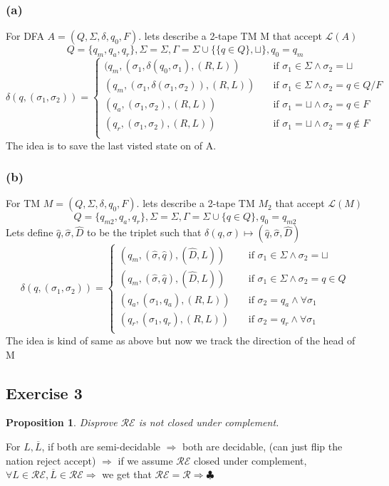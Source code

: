 \documentclass[12pt]{article}
\newtheorem{prop}{Proposition}
\begin{document}
\subsubsection*{(a)}For DFA  $A = (Q, \Sigma, \delta, q_0, F)$. lets describe a 2-tape TM M that accept $\mathcal{L}(A)$
\[
Q=\lbrace q_{m},q_a,q_r \rbrace,\Sigma =\Sigma ,\Gamma =\Sigma \cup\{\{q\in Q\} ,\sqcup \},q_0=q_{m}
\]
\[ \delta(q,(\sigma_1,\sigma_2))=
\begin{cases} 
      (q_m,(\sigma_1,\delta(q_0,\sigma_1),(R,L)) &\quad\text{if  } \sigma_1 \in \Sigma \wedge\sigma_2=\sqcup\\
       (q_m,(\sigma_1,\delta(\sigma_1,\sigma_2)),(R,L)) &\quad\text{if } \sigma_1 \in \Sigma \wedge\sigma_2=q\in Q/F \\
       (q_a,(\sigma_1,\sigma_2),(R,L)) &\quad\text{if } \sigma_1= \sqcup \wedge\sigma_2=q\in F \\
       (q_r,(\sigma_1,\sigma_2),(R,L)) &\quad\text{if } \sigma_1= \sqcup \wedge\sigma_2=q\notin F \\
     \end{cases}  
     \]   
The idea is to save the last visted state on of A.
\subsubsection*{(b)}
For TM  $M = (Q, \Sigma, \delta, q_0, F)$. lets describe a 2-tape TM $M_2$ that accept $\mathcal{L}(M)$
\[
Q=\lbrace q_{m2},q_a,q_r \rbrace,\Sigma =\Sigma ,\Gamma =\Sigma \cup\{q\in Q\} ,q_0=q_{m2}
\]
Lets define  $\hat{q},\hat{\sigma},\hat{D}$ to be the triplet such that $\delta(q,\sigma)\longmapsto (\hat{q},\hat{\sigma},\hat{D})$
\[ \delta(q,(\sigma_1,\sigma_2))=
\begin{cases} 
      (q_m,(\hat{\sigma},\hat{q}),(\hat{D},L)) &\quad\text{if  } \sigma_1 \in \Sigma \wedge\sigma_2=\sqcup\\
       (q_m,(\hat{\sigma},\hat{q}),(\hat{D},L)) &\quad\text{if } \sigma_1 \in \Sigma \wedge\sigma_2=q\in Q \\
       (q_a,(\sigma_1,q_a),(R,L)) &\quad\text{if }  \sigma_2=q_a \wedge \forall \sigma_1 \\
       (q_r,(\sigma_1,q_r),(R,L)) &\quad\text{if }\sigma_2=q_r \wedge \forall \sigma_1 \\ \end{cases}  
     \]  The idea is kind of same as above but now we track the direction of the head of M 
     \pagebreak
\subsection*{Exercise 3}
\begin{prop} Disprove $\mathcal{RE}$ is not closed under complement.\end{prop}
For $L,\overline{L}$, if both are semi-decidable $\Rightarrow$ both are decidable, (can just flip the nation reject accept)
$\Rightarrow$ if we assume $\mathcal{RE}$ closed under complement, $\forall L \in \mathcal{RE}, \overline{L} \in \mathcal{RE}\Rightarrow$ we get that $\mathcal{RE}=\mathcal{R} \Rightarrow \clubsuit $
\end{document}
